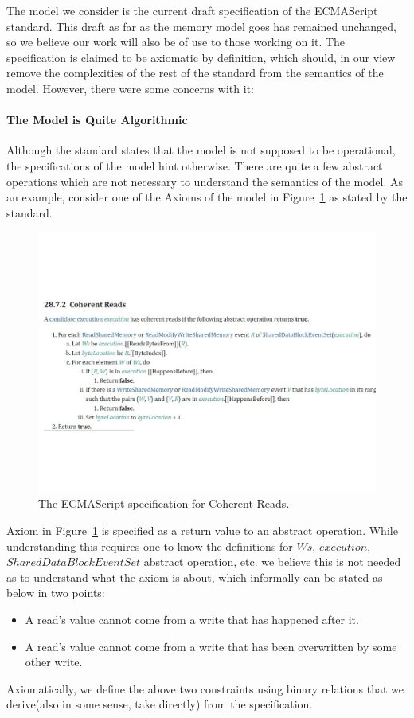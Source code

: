 
The model we consider is the current draft specification \cite{ECMA} of the ECMAScript standard. 
This draft as far as the memory model goes has remained unchanged, so we believe our work will also be of use to those working on it. 
The specification is claimed to be axiomatic by definition, which should, in our view remove the complexities of the rest of the standard from the semantics of the model.
However, there were some concerns with it: 

\paragraph{The Model is Quite Algorithmic}
    Although the standard states that the model is not supposed to be operational, the specifications of the model hint otherwise. 
    There are quite a few abstract operations which are not necessary to understand the semantics of the model. 
    As an example, consider one of the Axioms of the model in Figure~\ref{model:Std1} as stated by the standard. 
    \begin{figure}[H]
        \centering 
        \includegraphics[scale=0.6]{3.ECMAScriptMemoryModel/ECMAScriptStdCoherentReads.pdf}
        \caption{The ECMAScript specification for Coherent Reads.}
        \label{model:Std1}
    \end{figure}
    Axiom in Figure~\ref{model:Std1} is specified as a return value to an abstract operation. While understanding this requires one to know the definitions for $Ws$, $execution$, $SharedDataBlockEventSet$ abstract operation, etc. we believe this is not needed as to understand what the axiom is about, which informally can be stated as below in two points:
    \begin{itemize}
        \item A read's value cannot come from a write that has happened after it. 
        \item A read's value cannot come from a write that has been overwritten by some other write.  
    \end{itemize}
    Axiomatically, we define the above two constraints using binary relations that we derive(also in some sense, take directly) from the specification. 
    
